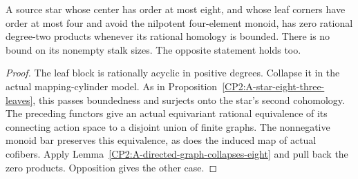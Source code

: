 \begin{corollary}
\label{CP2:A-star-eight-nonnilpotent-four-leaves}
A source star whose center has order at most eight, and
whose leaf corners have order at most four and avoid the
nilpotent four-element monoid, has zero rational degree-two
products whenever its rational homology is bounded.
There is no bound on its nonempty stalk sizes. The opposite
statement holds too.
\end{corollary}
\begin{proof}
The leaf block is rationally acyclic in positive degrees.
Collapse it in the actual mapping-cylinder model. As in
Proposition~\ref{CP2:A-star-eight-three-leaves}, this passes
boundedness and surjects onto the star's second cohomology.
The preceding functors give an actual equivariant rational
equivalence of its connecting action space to a disjoint
union of finite graphs. The nonnegative monoid bar preserves
this equivalence, as does the induced map of actual cofibers.
Apply Lemma~\ref{CP2:A-directed-graph-collapses-eight} and
pull back the zero products. Opposition gives the other case.
\end{proof}
